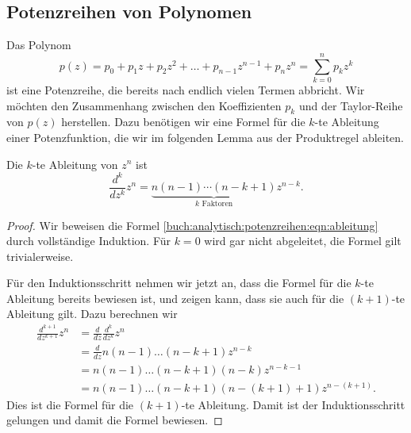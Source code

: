 %
%
%
\subsection{Potenzreihen von Polynomen
\label{buch:analytisch:potenzreihen:subsection:polynome}}
Das Polynom
\[
p(z)
=
p_0
+ 
p_1z
+
p_2z^2
+
\dots
+
p_{n-1}z^{n-1}
+
p_nz^n
=
\sum_{k=0}^n p_kz^k
\]
ist eine Potenzreihe, die bereits nach endlich vielen Termen
abbricht.
%
Wir möchten den Zusammenhang zwischen den Koeffizienten $p_k$
und der Taylor-Reihe von $p(z)$ herstellen.
%
%
Dazu benötigen wir eine Formel für die $k$-te Ableitung einer
Potenzfunktion, die wir im folgenden Lemma aus der Produktregel
ableiten.

\begin{lemma}
\label{buch:analytisch:potenzreihen:lemma:ableitung}
Die $k$-te Ableitung von $z^n$ ist
\begin{equation}
\frac{d^k}{dz^k}
z^n
=
\underbrace{
n(n-1)\cdots(n-k+1)
}_{\textstyle\text{$k$ Faktoren}}
z^{n-k}.
\label{buch:analytisch:potenzreihen:eqn:ableitung}
\end{equation}
\end{lemma}

\begin{proof}
Wir beweisen die Formel
\eqref{buch:analytisch:potenzreihen:eqn:ableitung}
durch vollständige Induktion.
Für $k=0$ wird gar nicht abgeleitet, die Formel gilt trivialerweise.

Für den Induktionsschritt nehmen wir jetzt an, dass die Formel für die
$k$-te Ableitung bereits bewiesen ist, und zeigen kann, dass sie auch
für die $(k+1)$-te Ableitung gilt.
Dazu berechnen wir
\begin{align*}
\frac{d^{k+1}}{dz^{k+1}} z^n
&=
\frac{d}{dz}
\frac{d^k}{dz^k}
z^n
\\
&=
\frac{d}{dz}
n(n-1)\dots(n-k+1) z^{n-k}
\\
&=
n(n-1)\dots(n-k+1)(n-k) z^{n-k-1}
\\
&=
n(n-1)\dots(n-k+1)(n-(k+1)+1) z^{n-(k+1)}.
\end{align*}
Dies ist die Formel für die $(k+1)$-te Ableitung.
Damit ist der Induktionsschritt gelungen und damit die Formel
bewiesen.
\end{proof}

